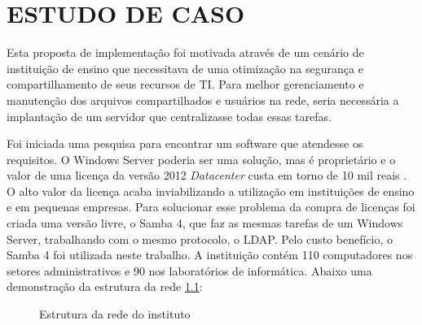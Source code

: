 \chapter{ESTUDO DE CASO}

Esta proposta de implementação foi motivada através de um cenário de instituição de ensino que necessitava de uma otimização na segurança e compartilhamento de seus recursos de TI. Para melhor gerenciamento e manutenção dos arquivos compartilhados e usuários na rede, seria necessária a implantação de um servidor que centralizasse todas essas tarefas.

Foi iniciada uma pesquisa para encontrar um software que atendesse os requisitos. O Windows Server poderia ser uma solução, mas é proprietário e o valor de uma licença da versão 2012 \textit{Datacenter} custa em torno de 10 mil reais \cite{SERVER}. O alto valor da licença acaba inviabilizando a utilização em instituições de ensino e em pequenas empresas. 
Para solucionar esse problema da compra de licenças foi criada uma versão livre, o Samba 4, que faz as mesmas tarefas de um Windows Server, trabalhando com o mesmo protocolo, o LDAP. Pelo custo benefício, o Samba 4 foi utilizada neste trabalho.
A instituição contém 110 computadores nos setores administrativos e 90 nos laboratórios de informática. Abaixo uma demonstração da estrutura da rede \ref{rede}:

\begin{figure}[h!]
   	\centering
   	\caption{Estrutura da rede do instituto}
    \label{rede}
\end{figure}

